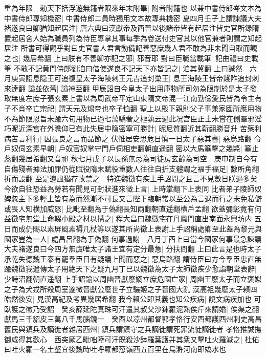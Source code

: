 重為年限　勑天下括浮遊無籍者限來年末附畢|{
	附者附籍也}
以兼中書侍郎岑文本為中書侍郎專知機密|{
	中書侍郎二員時獨用文本故專典機密}
夏四月壬子上謂諫議大夫褚遂良曰卿猶知起居注|{
	唐六典曰漢獻帝及西晉以後諸帝皆有起居注皆史官所録隋置起居舍人始為職員列為侍臣專掌其事每季為卷送付史官其以他官兼者則謂之知起居注}
所書可得觀乎對曰史官書人君言動備記善惡庶幾人君不敢為非未聞自取而觀之也|{
	幾居希翻}
上曰朕有不善卿亦記之邪|{
	邪音耶}
對曰臣職當載筆|{
	記曲禮曰史載筆}
不敢不記黄門侍郎劉洎曰借使遂良不記天下亦皆記之|{
	洎其冀翻}
上曰誠然　六月庚寅詔息隐王可追復皇太子海陵刺王元吉追封巢王|{
	息王海陵王皆帝踐阼追封刺來逹翻}
謚並依舊|{
	謚神至翻}
甲辰詔自今皇太子出用庫物所司勿為限制於是太子發取無度左庶子張玄素上書以為周武帝平定山東隋文帝混一江南勤儉愛民皆為令主有子不肖卒亡宗祀|{
	謂天元及焬帝也卒子恤翻}
聖上以殿下親則父子事兼家國所應用物不為節限恩旨未踰六旬用物已過七萬驕奢之極孰云過此况宫臣正士未嘗在側羣邪淫巧昵近深宫在外瞻仰已有此失居中隐密寧可勝計|{
	昵尼質翻近其靳翻勝音升}
苦藥利病苦言利行|{
	因張良之言而品節之}
伏惟居安思危日慎一日太子惡其書|{
	惡烏路翻}
令戶奴伺玄素早朝|{
	戶奴官奴掌守門戶伺相吏翻朝直遥翻}
密以大馬箠擊之幾斃|{
	箠止蕊翻幾居希翻又音祁}
秋七月戊子以長孫無忌為司徒房玄齡為司空　庚申制自今有自傷殘者據法加罪仍從賦役隋末賦役重數人往往自折支體謂之褔手褔足|{
	數所角翻折而設翻}
至是遺風猶存故禁之　特進魏徵有疾上手詔問之且言不見數日朕過多矣今欲自往恐益為勞若有聞見可封狀進來徵上言|{
	上時掌翻下上表同}
比者弟子陵師奴婢忽主下多輕上皆有為而然漸不可長又言陛下臨朝常以至公為言退而行之未免私僻或畏人知横加威怒|{
	比毗至翻為于偽翻長知兩翻朝直遥翻横戶孟翻}
欲蓋彌彰竟有何益徵宅無堂上命輟小殿之材以搆之|{
	程大昌曰魏徵宅在丹鳳門直出南面永興坊内}
五日而成仍賜以素屏風素褥几杖等以遂其所尚徵上表謝上手詔稱處卿至此蓋為黎元與國家豈為一人|{
	處昌呂翻為于偽翻}
何事過謝　八月丁酉上曰當今國家何事最急諫議大夫褚遂良曰今四方無虞唯太子諸王宜有定分最急|{
	分扶問翻}
上曰此言是也時太子承乾失德魏王泰有寵羣臣日有疑議上聞而惡之|{
	惡烏路翻}
謂侍臣曰方今羣臣忠直無踰魏徵我遣傳太子用絶天下之疑九月丁巳以魏徵為太子太師徵疾少愈詣朝堂表辭|{
	少詩沼翻朝直遥翻}
上手詔諭以周幽晉獻廢嫡立庶危國亡家|{
	周幽王廢太子而立褒姒之子為犬戎所殺周室遂微晉獻公廢世子立驪姬之子晉國大亂}
漢高袓幾廢太子賴四皓然後安|{
	見漢高紀及考異幾居希翻}
我今賴公即其義也知公疾病|{
	說文病疾加也}
可臥護之徵乃受詔　癸亥薛延陀真珠可汗遣其叔父沙鉢羅泥熟俟斤來請婚|{
	俟渠之翻}
獻馬三千貂皮三萬八千馬腦鏡一　癸酉以凉州都督郭孝恪行安西都護西州刺史高昌舊民與鎮兵及謫徙者雜居西州|{
	鎮兵謂鎮守之兵謫徙謂死罪流徒謫徙者}
孝恪推誠撫御咸得其歡心　西突厥乙毗咄陸可汗既殺沙鉢羅葉護并其衆又擊吐火羅滅之|{
	杜佑曰吐火羅一名土壑宜後魏時吐呼羅都䓤嶺西五百里在烏滸河南即媯水也}
